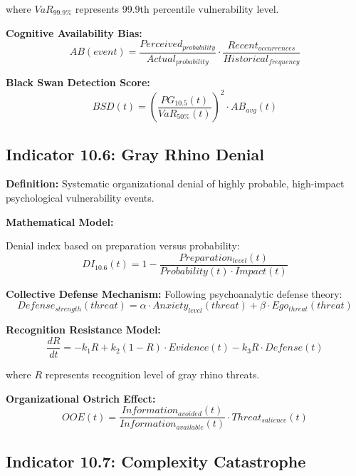\documentclass[11pt,a4paper]{article}
\begin{document}
where $VaR_{99.9\%}$ represents 99.9th percentile vulnerability level.

\textbf{Cognitive Availability Bias:}
\begin{equation}
AB(event) = \frac{Perceived_{probability}}{Actual_{probability}} \cdot \frac{Recent_{occurrences}}{Historical_{frequency}}
\end{equation}

\textbf{Black Swan Detection Score:}
\begin{equation}
BSD(t) = \left(\frac{PG_{10.5}(t)}{VaR_{50\%}(t)}\right)^2 \cdot AB_{avg}(t)
\end{equation}

\subsection{Indicator 10.6: Gray Rhino Denial}

\textbf{Definition:} Systematic organizational denial of highly probable, high-impact psychological vulnerability events.

\textbf{Mathematical Model:}

Denial index based on preparation versus probability:
\begin{equation}
DI_{10.6}(t) = 1 - \frac{Preparation_{level}(t)}{Probability(t) \cdot Impact(t)}
\end{equation}

\textbf{Collective Defense Mechanism:}
Following psychoanalytic defense theory:
\begin{equation}
Defense_{strength}(threat) = \alpha \cdot Anxiety_{level}(threat) + \beta \cdot Ego_{threat}(threat)
\end{equation}

\textbf{Recognition Resistance Model:}
\begin{equation}
\frac{dR}{dt} = -k_1 R + k_2 (1-R) \cdot Evidence(t) - k_3 R \cdot Defense(t)
\end{equation}

where $R$ represents recognition level of gray rhino threats.

\textbf{Organizational Ostrich Effect:}
\begin{equation}
OOE(t) = \frac{Information_{avoided}(t)}{Information_{available}(t)} \cdot Threat_{salience}(t)
\end{equation}

\subsection{Indicator 10.7: Complexity Catastrophe}
\end{document}
